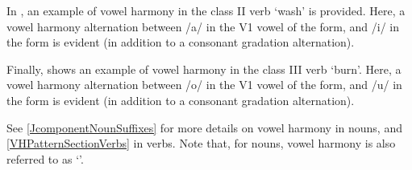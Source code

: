In , an example of vowel harmony in the class II verb  ‘wash’ is provided. Here, a vowel harmony alternation between /a/ in the V1 vowel of the  form, and /i/ in the  form is evident (in addition to a consonant gradation alternation). 
\ea\label{vhEx2}%
\z

Finally,  shows an example of vowel harmony in the class III verb  ‘burn’. Here, a vowel harmony alternation between /o/ in the V1 vowel of the  form, and /u/ in the  form is evident (in addition to a consonant gradation alternation). 
\ea\label{vhEx3}%
\z


See \SEC\ref{JcomponentNounSuffixes} for more details on vowel harmony in nouns, and \SEC\ref{VHPatternSectionVerbs} in verbs. Note that, for nouns, vowel harmony is also referred to as ‘\jvh’.
\FB



